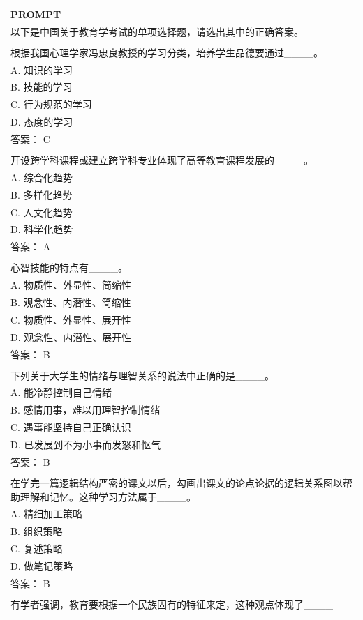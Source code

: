 \begin{table}[h]
    \centering \small
\begin{tabular}{p{12cm}}
\toprule
\textbf{PROMPT}\\
以下是中国关于教育学考试的单项选择题，请选出其中的正确答案。
\\
\\根据我国心理学家冯忠良教授的学习分类，培养学生品德要通过\_\_\_\_。
\\A. 知识的学习
\\B. 技能的学习
\\C. 行为规范的学习
\\D. 态度的学习
\\答案： C
\\
\\开设跨学科课程或建立跨学科专业体现了高等教育课程发展的\_\_\_\_。
\\A. 综合化趋势
\\B. 多样化趋势
\\C. 人文化趋势
\\D. 科学化趋势
\\答案： A
\\
\\心智技能的特点有\_\_\_\_。
\\A. 物质性、外显性、简缩性
\\B. 观念性、内潜性、简缩性
\\C. 物质性、外显性、展开性
\\D. 观念性、内潜性、展开性
\\答案： B
\\
\\下列关于大学生的情绪与理智关系的说法中正确的是\_\_\_\_。
\\A. 能冷静控制自己情绪
\\B. 感情用事，难以用理智控制情绪
\\C. 遇事能坚持自己正确认识
\\D. 已发展到不为小事而发怒和怄气
\\答案： B
\\
\\在学完一篇逻辑结构严密的课文以后，勾画出课文的论点论据的逻辑关系图以帮助理解和记忆。这种学习方法属于\_\_\_\_。
\\A. 精细加工策略
\\B. 组织策略
\\C. 复述策略
\\D. 做笔记策略
\\答案： B
\\
\\有学者强调，教育要根据一个民族固有的特征来定，这种观点体现了\_\_\_\_

\end{tabular}
\end{table}

